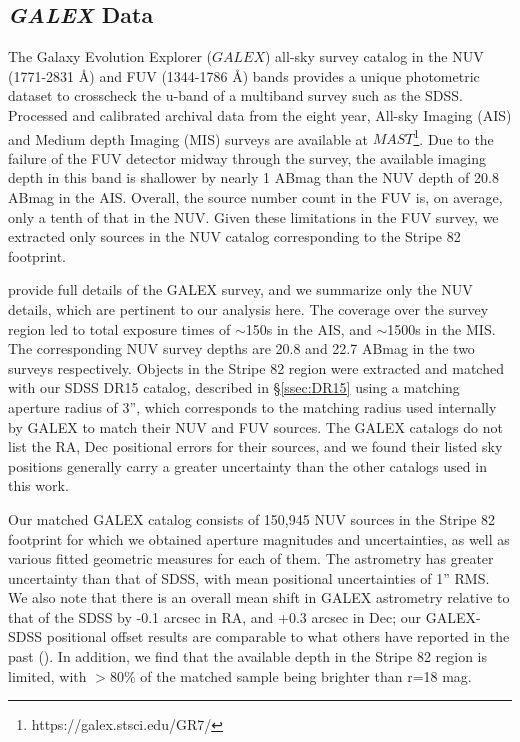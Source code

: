 \documentclass[fleqn,usenatbib]{mnras}
\begin{document}

\subsection{{\it GALEX} Data} \label{ssec:galex}

The Galaxy Evolution Explorer ($GALEX$) all-sky survey catalog in the NUV (1771-2831 \AA) and FUV (1344-1786 \AA) bands provides a unique photometric dataset to crosscheck the u-band of a multiband survey such as the SDSS. Processed and calibrated archival data from the eight year, All-sky Imaging (AIS) and Medium depth Imaging (MIS) surveys are available at $MAST$\footnote{https://galex.stsci.edu/GR7/}. Due to the failure of the FUV detector midway through the survey, the available imaging depth in this band is shallower by nearly 1 ABmag than the NUV depth of 20.8 ABmag in the AIS. Overall, the source number count in the FUV is, on average, only a tenth of that in the NUV. Given these limitations in the FUV survey, we extracted only sources in the NUV catalog corresponding to the Stripe 82 footprint.  
 
\citet{2017ApJS..230...24B} provide full details of the GALEX survey, and we summarize only the NUV details, which are pertinent to our analysis here. The coverage over the survey region led to total exposure times of $\sim$150s in the AIS, and $\sim$1500s in the MIS. The corresponding NUV survey depths are 20.8 and 22.7 ABmag in the two surveys respectively. Objects in the Stripe 82 region were extracted and matched with our SDSS DR15 catalog, described in \S \ref{ssec:DR15} using a matching aperture radius of 3'', which corresponds to the matching radius used internally by GALEX to match their NUV and FUV sources. The GALEX catalogs do not list the RA, Dec positional errors for their sources, and we found their listed sky positions generally carry a greater uncertainty than the other catalogs used in this work.

Our matched GALEX catalog consists of 150,945 NUV sources in the Stripe 82 footprint for which we obtained aperture magnitudes and uncertainties, as well as various fitted geometric measures for each of them. The astrometry has greater uncertainty than that of SDSS, with mean positional uncertainties of 1'' RMS. We also note that there is an overall mean shift in GALEX astrometry relative to that of the SDSS by -0.1 arcsec in RA, and +0.3 arcsec in Dec; our GALEX-SDSS positional offset results are comparable to what others have reported in the past (\citealt{Ague2005, Morr2007, Hein2009, Bian2014}). In addition, we find that the available depth in the Stripe 82 region is limited, with $>$80\% of the matched sample being brighter than r=18 mag. 
  
\end{document}
